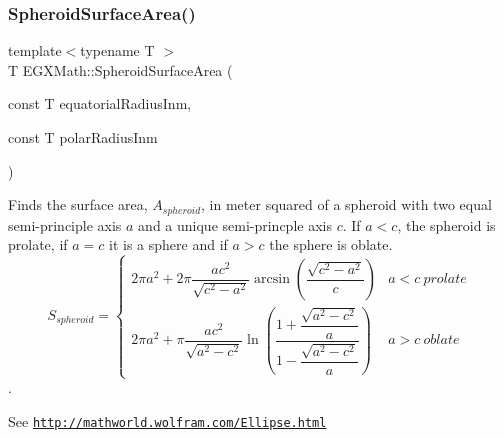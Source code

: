 \subsubsection{\texorpdfstring{Spheroid\+Surface\+Area()}{SpheroidSurfaceArea()}}
{\footnotesize\ttfamily template$<$typename T $>$ \\
T E\+G\+X\+Math\+::\+Spheroid\+Surface\+Area (\begin{DoxyParamCaption}\item[{const T}]{equatorial\+Radius\+Inm,  }\item[{const T}]{polar\+Radius\+Inm }\end{DoxyParamCaption})}



Finds the surface area, $A_{spheroid}$, in meter squared of a spheroid with two equal semi-\/principle axis $a$ and a unique semi-\/princple axis $c$. If $a < c$, the spheroid is prolate, if $a = c$ it is a sphere and if $a>c$ the sphere is oblate. \[ S_{spheroid}=\begin{cases} 2\pi a^2 + 2\pi\dfrac{a c^2}{\sqrt{c^2-a^2}}\arcsin \left ( \dfrac{\sqrt{c^2-a^2}}{c} \right ) & a<c\ prolate \\ 2\pi a^2 +\pi \dfrac{a c^2}{\sqrt{a^2-c^2}}\ln \left(\dfrac{1+\dfrac{\sqrt{a^2-c^2}}{a}}{1-\dfrac{\sqrt{a^2-c^2}}{a}}\right )& a>c\ oblate \end{cases} \]. 

See \href{http://mathworld.wolfram.com/Ellipse.html}{\tt http\+://mathworld.\+wolfram.\+com/\+Ellipse.\+html}


